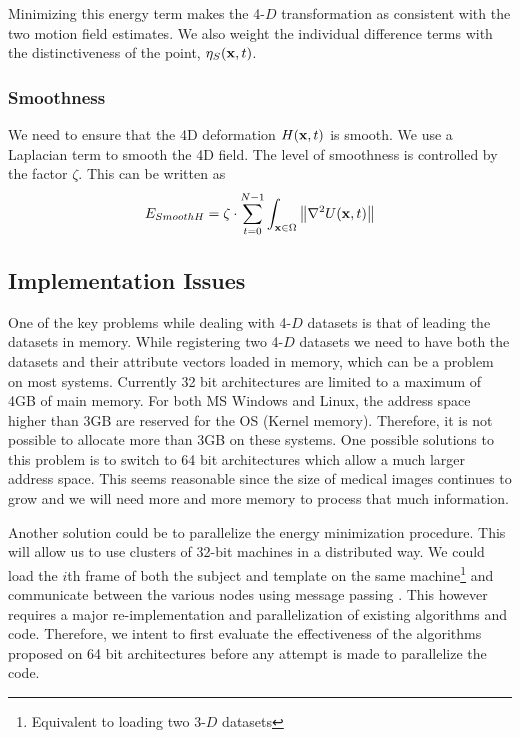 Minimizing this energy term makes the 4-$D$ transformation as consistent with the two motion field estimates. We also weight the individual difference terms with the distinctiveness of the point, $\eta_S ( \mathbf{x}, t )$.  

\subsubsection{Smoothness}
We need to ensure that the 4D deformation $H ( \mathbf{x}, t )$ is smooth. We use a Laplacian term to smooth the 4D field. The level of smoothness is controlled by the factor $\zeta$. This can be written as
\begin{equation}
E_{SmoothH} = \zeta \cdot \sum_{t = 0}^{N - 1} \int_{\mathbf{x} \in \Omega} \left\| \nabla^2 U ( \mathbf{x}, t
   ) \right\|
\end{equation}

\subsection{Implementation Issues}

One of the key problems while dealing with 4-$D$ datasets is that of leading the datasets in memory. While registering two 4-$D$ datasets we need to have both the datasets and their attribute vectors loaded in memory, which can be a problem on most systems. Currently 32 bit architectures are limited to a maximum of 4GB of main memory. For both MS Windows and Linux, the address space higher than 3GB are reserved for the OS (Kernel memory). Therefore, it is not possible to allocate more than 3GB on these systems. One possible solutions to this problem is to switch to 64 bit architectures which allow a much larger address space. This seems reasonable since the size of medical images continues to grow and we will need more and more memory to process that much information.

Another solution could be to parallelize the energy minimization procedure. This will allow us to use clusters of 32-bit machines in a distributed way. We could load the $i$th frame of both the subject and template on the same machine\footnote{Equivalent to loading two 3-$D$ datasets} and communicate between the various nodes using message passing \cite{mpi}. This however requires a major re-implementation and parallelization of existing algorithms and code. Therefore, we intent to first evaluate the effectiveness of the algorithms proposed on 64 bit architectures before any attempt is made to parallelize the code.

